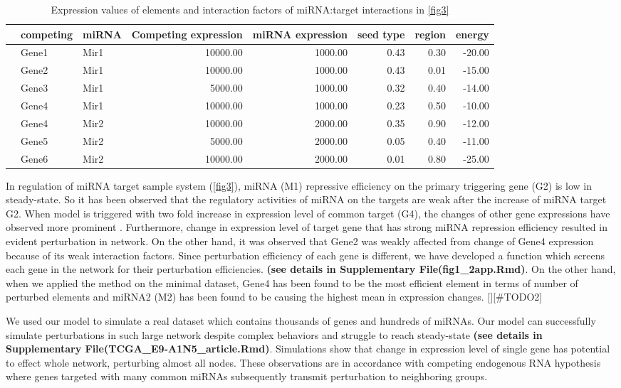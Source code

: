 \documentclass[]{article}
\begin{document}
\begin{table}[ht]
\centering
\caption{Expression values of elements and interaction factors of miRNA:target interactions in \autoref{fig3}} 
\begin{tabular}{rllrrrrr}
  \hline
 & competing & miRNA & Competing expression & miRNA expression & seed type & region & energy \\ 
  \hline
   & Gene1 & Mir1 & 10000.00 & 1000.00 & 0.43 & 0.30 & -20.00 \\ 
   & Gene2 & Mir1 & 10000.00 & 1000.00 & 0.43 & 0.01 & -15.00 \\ 
   & Gene3 & Mir1 & 5000.00 & 1000.00 & 0.32 & 0.40 & -14.00 \\ 
   & Gene4 & Mir1 & 10000.00 & 1000.00 & 0.23 & 0.50 & -10.00 \\ 
   & Gene4 & Mir2 & 10000.00 & 2000.00 & 0.35 & 0.90 & -12.00 \\ 
   & Gene5 & Mir2 & 5000.00 & 2000.00 & 0.05 & 0.40 & -11.00 \\ 
   & Gene6 & Mir2 & 10000.00 & 2000.00 & 0.01 & 0.80 & -25.00 \\ 
   \hline
\end{tabular}
\label{tab:one}
\end{table}

In regulation of miRNA target sample system (\autoref{fig3}), miRNA (M1)
repressive efficiency on the primary triggering gene (G2) is low in
steady-state. So it has been observed that the regulatory activities of
miRNA on the targets are weak after the increase of miRNA target G2.
When model is triggered with two fold increase in expression level of
common target (G4), the changes of other gene expressions have observed
more prominent \href{}{}. Furthermore, change in expression level of
target gene that has strong miRNA repression efficiency resulted in
evident perturbation in network. On the other hand, it was observed that
Gene2 was weakly affected from change of Gene4 expression because of its
weak interaction factors. Since perturbation efficiency of each gene is
different, we have developed a function which screens each gene in the
network for their perturbation efficiencies. \textbf{(see details in
Supplementary File(fig1\_2app.Rmd)}. On the other hand, when we applied
the method on the minimal dataset, Gene4 has been found to be the most
efficient element in terms of number of perturbed elements and miRNA2
(M2) has been found to be causing the highest mean in expression
changes. {[}{]}{[}\#TODO2{]}

We used our model to simulate a real dataset which contains thousands of
genes and hundreds of miRNAs. Our model can successfully simulate
perturbations in such large network despite complex behaviors and
struggle to reach steady-state \textbf{(see details in Supplementary
File(TCGA\_E9-A1N5\_article.Rmd)}. Simulations show that change in
expression level of single gene has potential to effect whole network,
perturbing almost all nodes. These observations are in accordance with
competing endogenous RNA hypothesis where genes targeted with many
common miRNAs subsequently transmit perturbation to neighboring groups.
\end{document}
